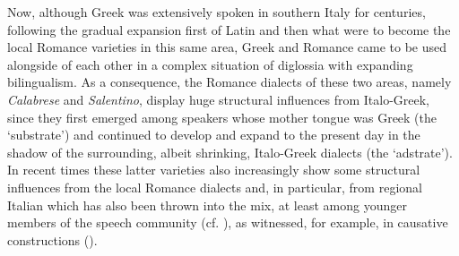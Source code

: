 \documentclass[output=paper,modfonts,nonflat,colorlinks,citecolor=brown]{langsci/langscibook}
\begin{document}
Now, although Greek was extensively spoken in southern Italy for centuries, following the gradual expansion first of Latin and then what were to become the local Romance varieties in this same area, Greek and Romance came to be used alongside of each other in a complex situation of diglossia with expanding bilingualism. As a consequence, the Romance dialects of these two areas, namely \textit{Calabrese} and \textit{Salentino}, display huge structural influences from Italo-Greek, since they first emerged among speakers whose mother tongue was Greek (the `substrate') and continued to develop and expand to the present day in the shadow of the surrounding, albeit shrinking, Italo-Greek dialects (the `adstrate'). In recent times these latter varieties also increasingly show some structural influences from the local Romance dialects and, in particular, from regional Italian which has also been thrown into the mix, at least among younger members of the speech community (cf. \citealt[338]{Martino1980,Profili1985,Marra2008,Romano2008}), as witnessed, for example, in causative constructions (\citealt{LedgewaySchifanoSilvestriInpress, LedgewaySchifanoSilvestriInPrep}).
\end{document}
